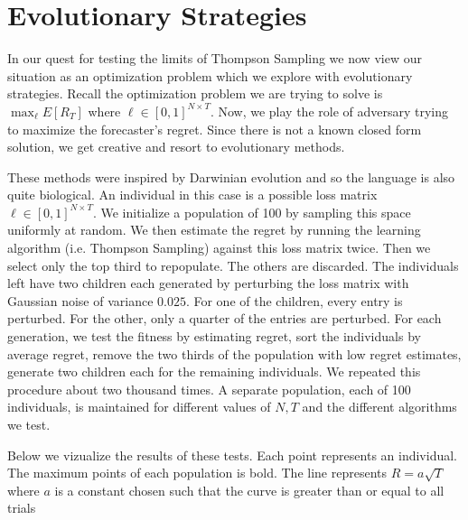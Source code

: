 \documentclass[10pt,a4paper]{article} %
\begin{document}
	
	\pagebreak
	
	\section{Evolutionary Strategies}	
	
	In our quest for testing the limits of Thompson Sampling we now view our situation as an optimization problem which we explore with evolutionary strategies.  Recall the optimization problem we are trying to solve is $ \max_\ell E [R_T] $ where $\ell \in \left[ 0, 1 \right]^{N \times T} $.  Now, we play the role of adversary trying to maximize the forecaster's regret.  Since there is not a known closed form solution, we get creative and resort to evolutionary methods.
		
	These methods were inspired by Darwinian evolution and so the language is also quite biological.  An individual in this case is a possible loss matrix $\ell \in \left[ 0, 1 \right]^{N \times T} $.  We initialize a population of 100 by sampling this space uniformly at random.  We then estimate the regret by running the learning algorithm (i.e. Thompson Sampling) against this loss matrix twice.  Then we select only the top third to repopulate.  The others are discarded.  The individuals left have two children each generated by perturbing the loss matrix with Gaussian noise of variance $0.025$.  For one of the children, every entry is perturbed. For the other, only a quarter of the entries are perturbed.  For each generation, we test the fitness by estimating regret, sort the individuals by average regret, remove the two thirds of the population with low regret estimates, generate two children each for the remaining individuals.  We repeated this procedure about two thousand times.  A separate population, each of 100 individuals, is maintained for different values of $N, T$ and the different algorithms we test.
		
	Below we vizualize the results of these tests.  Each point represents an individual.  The maximum points of each population is bold.  The line represents $R = a \sqrt{T}$ where $a$ is a constant chosen such that the curve is greater than or equal to all trials 
	
		
	\begin{figure}[h!]
	\end{figure}
\end{document}

